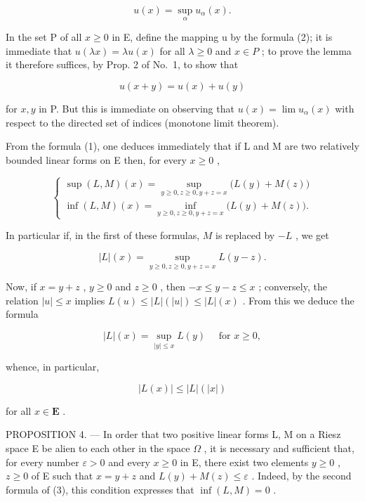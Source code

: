 \[
u (x) = \sup _ {\alpha} u _ {\alpha} (x).\tag{2}
\]

In the set P of all \(x \geqslant 0\) in E, define the mapping u by the formula (2); it is immediate that \(u(\lambda x) = \lambda u(x)\) for all \(\lambda \geqslant 0\) and \(x \in P\) ; to prove the lemma it therefore suffices, by Prop. 2 of No.~1, to show that

\[
u (x + y) = u (x) + u (y)
\]

for \(x, y\) in P. But this is immediate on observing that \(u(x) = \lim u_{\alpha}(x)\) with respect to the directed set of indices (monotone limit theorem).

From the formula (1), one deduces immediately that if L and M are two relatively bounded linear forms on E then, for every \(x \geqslant 0\) ,

\[
\left\{ \begin{array}{l} \sup (L, M) (x) = \sup _ {y \geqslant 0,   z \geqslant 0,   y + z = x} \big (L (y) + M (z) \big) \\ \inf (L, M) (x) = \inf _ {y \geqslant 0,   z \geqslant 0,   y + z = x} \big (L (y) + M (z) \big). \end{array} \right.\tag{3}
\]

In particular if, in the first of these formulas, \(M\) is replaced by \(-L\) , we get

\[
| L | (x) = \sup _ {y \geqslant 0, z \geqslant 0, y + z = x} L (y - z).
\]

Now, if \(x = y + z\) , \(y \geqslant 0\) and \(z \geqslant 0\) , then \(-x \leqslant y - z \leqslant x\) ; conversely, the relation \(|u| \leqslant x\) implies \(L(u) \leqslant |L|(|u|) \leqslant |L|(x)\) . From this we deduce the formula

\[
| L | (x) = \sup _ {| y | \leqslant x} L (y) \quad \text { for } x \geqslant 0,\tag{4}
\]

whence, in particular,

\[
| L (x) | \leqslant | L | (| x |)\tag{5}
\]

for all \(x \in \mathbf{E}\) .

PROPOSITION 4. --- In order that two positive linear forms L, M on a Riesz space E be alien to each other in the space \(\Omega\) , it is necessary and sufficient that, for every number \(\varepsilon > 0\) and every \(x \geqslant 0\) in E, there exist two elements \(y \geqslant 0\) , \(z \geqslant 0\) of E such that \(x = y + z\) and \(L(y) + M(z) \leqslant \varepsilon\) . Indeed, by the second formula of (3), this condition expresses that \(\inf(L, M) = 0\) .

